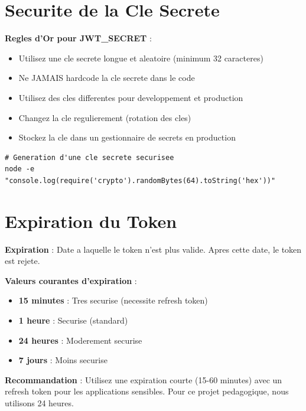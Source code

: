 \documentclass[a4paper,12pt]{book}
\begin{document}
\section{Securite de la Cle Secrete}

\begin{securitybox}
    \textbf{Regles d'Or pour JWT\_SECRET} :
    \begin{itemize}
        \item Utilisez une cle secrete longue et aleatoire (minimum 32 caracteres)
        \item Ne JAMAIS hardcode la cle secrete dans le code
        \item Utilisez des cles differentes pour developpement et production
        \item Changez la cle regulierement (rotation des cles)
        \item Stockez la cle dans un gestionnaire de secrets en production
    \end{itemize}
\end{securitybox}

\begin{lstlisting}[style=bash]
# Generation d'une cle secrete securisee
node -e "console.log(require('crypto').randomBytes(64).toString('hex'))"
\end{lstlisting}

\section{Expiration du Token}

\begin{definitionbox}
    \textbf{Expiration} : Date a laquelle le token n'est plus valide. Apres cette date, le token est rejete.
\end{definitionbox}

\textbf{Valeurs courantes d'expiration} :
\begin{itemize}
    \item \textbf{15 minutes} : Tres securise (necessite refresh token)
    \item \textbf{1 heure} : Securise (standard)
    \item \textbf{24 heures} : Moderement securise
    \item \textbf{7 jours} : Moins securise
\end{itemize}

\begin{bestpracticebox}
    \textbf{Recommandation} : Utilisez une expiration courte (15-60 minutes) avec un refresh token pour les applications sensibles. Pour ce projet pedagogique, nous utilisons 24 heures.
\end{bestpracticebox}
\end{document}
